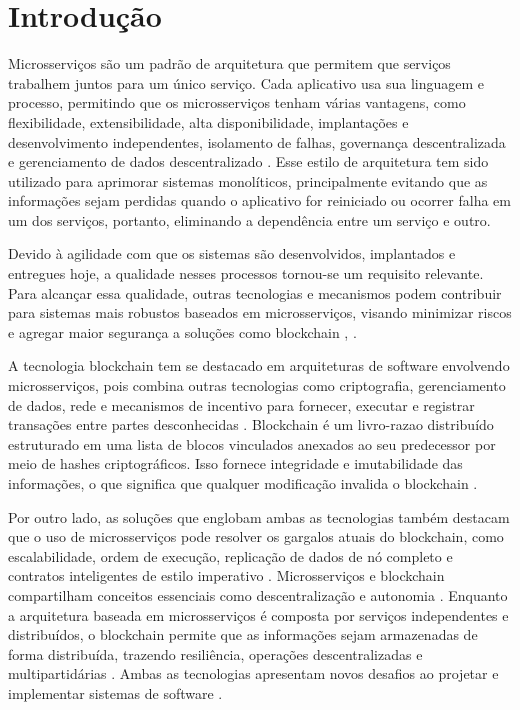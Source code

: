 \chapter{Introdução}
\label{ch:introducao}

Microsserviços são um padrão de arquitetura que permitem que serviços trabalhem juntos para um único serviço. Cada aplicativo usa sua linguagem e processo, permitindo que os microsserviços tenham várias vantagens, como flexibilidade, extensibilidade, alta disponibilidade, implantações e desenvolvimento independentes, isolamento de falhas, governança descentralizada e gerenciamento de dados descentralizado \cite{wang2020smart}. Esse estilo de arquitetura tem sido utilizado para aprimorar sistemas monolíticos, principalmente evitando que as informações sejam perdidas quando o aplicativo for reiniciado ou ocorrer falha em um dos serviços, portanto, eliminando a dependência entre um serviço e outro.

Devido à agilidade com que os sistemas são desenvolvidos, implantados e entregues hoje, a qualidade nesses processos tornou-se um requisito relevante. Para alcançar essa qualidade, outras tecnologias e mecanismos podem contribuir para sistemas mais robustos baseados em microsserviços, visando minimizar riscos e agregar maior segurança a soluções como blockchain \cite{xu2019blendmas}, \cite{dilshan2020mschain}.

A tecnologia blockchain tem se destacado em arquiteturas de software envolvendo microsserviços, pois combina outras tecnologias como criptografia, gerenciamento de dados, rede e
mecanismos de incentivo para fornecer, executar e registrar transações entre partes desconhecidas \cite{xu2019architecture}. Blockchain é um livro-razao distribuído estruturado em uma lista de blocos vinculados anexados ao seu predecessor por meio de hashes criptográficos. Isso fornece integridade e imutabilidade das informações, o que significa que qualquer modificação invalida o blockchain \cite{wust2018you}.

Por outro lado, as soluções que englobam ambas as tecnologias
também destacam que o uso de microsserviços pode resolver os gargalos atuais do blockchain, como escalabilidade, ordem de execução, replicação de dados de nó completo e contratos inteligentes de estilo imperativo \cite{bandara2021saas}. Microsserviços e blockchain compartilham conceitos essenciais como descentralização e autonomia \cite{cstefan2020blockchain}. Enquanto a arquitetura baseada em microsserviços é composta por serviços independentes e distribuídos, o blockchain permite que as informações sejam armazenadas de forma distribuída, trazendo resiliência, operações descentralizadas e multipartidárias \cite{de2020building}. Ambas as tecnologias apresentam novos desafios ao projetar e implementar sistemas de software \cite{cstefan2020blockchain}.

